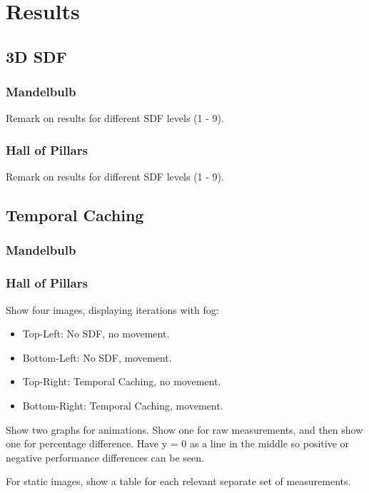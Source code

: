 \chapter{Results}
\label{chapter4}

\section{3D SDF}

\subsection{Mandelbulb}

Remark on results for different SDF levels (1 - 9).

\subsection{Hall of Pillars}

Remark on results for different SDF levels (1 - 9).

\section{Temporal Caching}

\subsection{Mandelbulb}

\subsection{Hall of Pillars}

Show four images, displaying iterations with fog:
\begin{itemize}
	\item Top-Left: No SDF, no movement.
	\item Bottom-Left: No SDF, movement.
	\item Top-Right: Temporal Caching, no movement.
	\item Bottom-Right: Temporal Caching, movement.
\end{itemize}

Show two graphs for animations. Show one for raw measurements, and then show one for percentage difference. Have y = 0 as a line in the middle so positive or negative performance differences can be seen.\newline

For static images, show a table for each relevant separate set of measurements.
